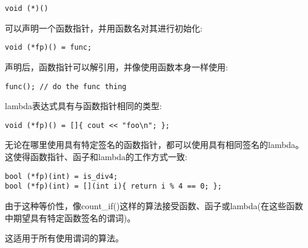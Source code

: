 \begin{lstlisting}[style=styleCXX]
void (*)()
\end{lstlisting}

可以声明一个函数指针，并用函数名对其进行初始化:

\begin{lstlisting}[style=styleCXX]
void (*fp)() = func;
\end{lstlisting}

声明后，函数指针可以解引用，并像使用函数本身一样使用:

\begin{lstlisting}[style=styleCXX]
func(); // do the func thing
\end{lstlisting}

lambda表达式具有与函数指针相同的类型:

\begin{lstlisting}[style=styleCXX]
void (*fp)() = []{ cout << "foo\n"; };
\end{lstlisting}

无论在哪里使用具有特定签名的函数指针，都可以使用具有相同签名的lambda。这使得函数指针、函子和lambda的工作方式一致:

\begin{lstlisting}[style=styleCXX]
bool (*fp)(int) = is_div4;
bool (*fp)(int) = [](int i){ return i % 4 == 0; };
\end{lstlisting}

由于这种等价性，像count\_if()这样的算法接受函数、函子或lambda(在这些函数中期望具有特定函数签名的谓词)。

这适用于所有使用谓词的算法。





